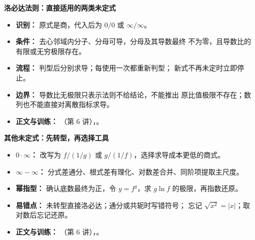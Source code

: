 \begin{knowledgeBox}
\textbf{洛必达法则：直接适用的两类未定式}

\begin{itemize}
  \item \textbf{识别：} 原式是商，代入后为 \(0/0\) 或
  \(\infty/\infty\)。
  \item \textbf{条件：} 去心邻域内分子、分母可导，分母及其导数最终
  不为零，且导数比的有限或无穷极限存在。
  \item \textbf{流程：} 判型后分别求导；每使用一次都重新判型；
  新式不再未定时立即停止。
  \item \textbf{边界：} 导数比无极限只表示法则不给结论，不能推出
  原比值极限不存在；数列也不能直接对离散指标求导。
  \item \textbf{正文与训练：}
  （第 6 讲），。
\end{itemize}
\end{knowledgeBox}

\begin{knowledgeBox}
\textbf{其他未定式：先转型，再选择工具}

\begin{itemize}
  \item \textbf{\(0\cdot\infty\)：}
  改写为 \(f/(1/g)\) 或 \(g/(1/f)\)，选择求导成本更低的商式。
  \item \textbf{\(\infty-\infty\)：}
  分式差通分、根式差有理化、对数差合并、同阶项提取主尺度。
  \item \textbf{幂指型：} 确认底数最终为正，令
  \(y=f^g\)，求 \(g\ln f\) 的极限，再指数还原。
  \item \textbf{易错点：} 未转型直接洛必达；通分或共轭时写错符号；
  忘记 \(\sqrt{x^2}=|x|\)；取对数后忘记还原。
  \item \textbf{正文与训练：}
  （第 6 讲），。
\end{itemize}
\end{knowledgeBox}

